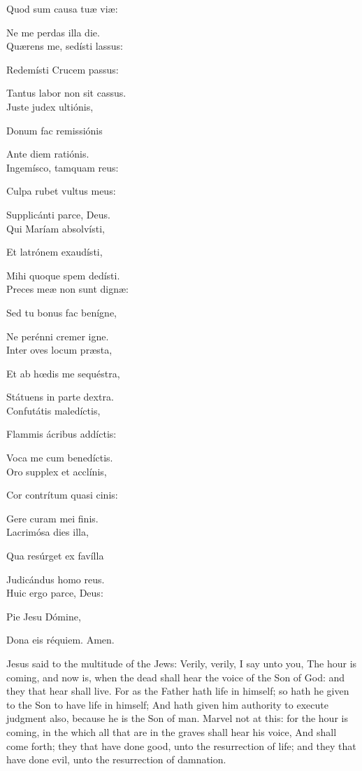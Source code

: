 {Quod sum causa tu{\ae} vi{\ae}:

Ne me perdas illa die.\\

Qu{\ae}rens me, sedísti lassus:

Redemísti Crucem passus:

Tantus labor non sit cassus.\\

Juste judex ultiónis,

Donum fac remissiónis

Ante diem ratiónis.\\

Ingemísco, tamquam reus:

Culpa rubet vultus meus:

Supplicánti parce, Deus.\\

Qui Maríam absolvísti,

Et latrónem exaudísti,

Mihi quoque spem dedísti.\\

Preces me{\ae} non sunt dign{\ae}:

Sed tu bonus fac benígne,

Ne perénni cremer igne.\\

Inter oves locum pr{\ae}sta,

Et ab h{\oe}dis me sequéstra,

Státuens in parte dextra.\\

Confutátis maledíctis,

Flammis ácribus addíctis:

Voca me cum benedíctis.\\

Oro supplex et acclínis,

Cor contrítum quasi cinis:

Gere curam mei finis.\\

Lacrimósa dies illa,

Qua resúrget ex favílla

Judicándus homo reus.\\

Huic ergo parce, Deus:

Pie Jesu Dómine,

Dona eis réquiem. Amen.}
 Jesus said to the multitude of the Jews: Verily, verily, I say unto you, The hour is coming, and now is, when the dead shall hear the voice of the Son of God: and they that hear shall live. For as the Father hath life in himself; so hath he given to the Son to have life in himself; And hath given him authority to execute judgment also, because he is the Son of man. Marvel not at this: for the hour is coming, in the which all that are in the graves shall hear his voice, And shall come forth; they that have done good, unto the resurrection of life; and they that have done evil, unto the resurrection of damnation.
